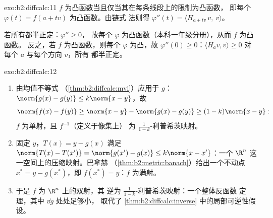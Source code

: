 \begin{solution}{exo:b2:diffcalc:11}
$f$ 为凸函数当且仅当其在每条线段上的限制为凸函数，
即每个 $\varphi(t) = f(a + tv)$ 为凸函数。由链式
法则得 $\varphi''(t) = \langle H_{a+tv}\,v,\ v\rangle$。

若所有都半正定：$\varphi'' \geq 0$，
故每个 $\varphi$ 为凸函数（本科一年级分册），从而 $f$ 为凸函数。
反之，若 $f$ 为凸函数，则每个 $\varphi$ 为凸，故
$\varphi''(0) \geq 0$：$\langle H_a v, v\rangle \geq 0$ 对
每个 $a$ 与每个方向 $v$，所有
都半正定。
\end{solution}

\begin{solution}{exo:b2:diffcalc:12}
\begin{enumerate}
  \item 由均值不等式
        （\cref{thm:b2:diffcalc:mvi}）应用于 $g$：
        $\norm{g(x) - g(y)} \leq k\norm{x-y}$，故
        \[
        \norm{f(x) - f(y)} \geq \norm{x - y} - \norm{g(x) -
        g(y)} \geq (1 - k)\norm{x - y} :
        \]
        $f$ 为单射，且 $f^{-1}$（定义于像集上）
        为 $\frac{1}{1-k}$-利普希茨映射。
  \item 固定 $y$，$T(x) = y - g(x)$ 满足 $\norm{T(x) -
        T(x')} = \norm{g(x') - g(x)} \leq k\norm{x - x'}$：一个
        $\R^n$ 这一空间上的压缩映射。巴拿赫
        （\cref{thm:b2:metric:banach}）给出一个不动点 $x^*
        = y - g(x^*)$，即 $f(x^*) = y$：$f$ 为满射。
  \item 于是 $f$ 为 $\R^n$ 上的双射，其
        逆为 $\frac{1}{1-k}$-利普希茨映射：一个整体反函数
        定理，其中 $\dd g$ 处处足够小，
        取代了
        \cref{thm:b2:diffcalc:inverse} 中的局部可逆性假设。
\end{enumerate}
\end{solution}

